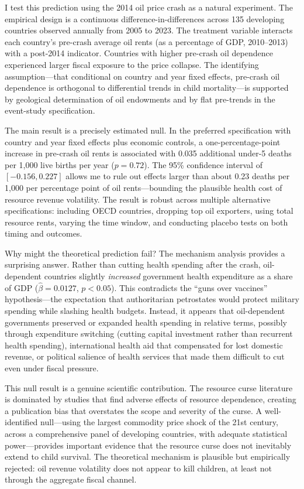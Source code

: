 \documentclass[12pt]{article}
\begin{document}
I test this prediction using the 2014 oil price crash as a natural experiment. The empirical design is a continuous difference-in-differences across 135 developing countries observed annually from 2005 to 2023. The treatment variable interacts each country's pre-crash average oil rents (as a percentage of GDP, 2010--2013) with a post-2014 indicator. Countries with higher pre-crash oil dependence experienced larger fiscal exposure to the price collapse. The identifying assumption---that conditional on country and year fixed effects, pre-crash oil dependence is orthogonal to differential trends in child mortality---is supported by geological determination of oil endowments and by flat pre-trends in the event-study specification.

The main result is a precisely estimated null. In the preferred specification with country and year fixed effects plus economic controls, a one-percentage-point increase in pre-crash oil rents is associated with 0.035 additional under-5 deaths per 1,000 live births per year ($p = 0.72$). The 95\% confidence interval of $[-0.156, 0.227]$ allows me to rule out effects larger than about 0.23 deaths per 1,000 per percentage point of oil rents---bounding the plausible health cost of resource revenue volatility. The result is robust across multiple alternative specifications: including OECD countries, dropping top oil exporters, using total resource rents, varying the time window, and conducting placebo tests on both timing and outcomes.

Why might the theoretical prediction fail? The mechanism analysis provides a surprising answer. Rather than cutting health spending after the crash, oil-dependent countries slightly \textit{increased} government health expenditure as a share of GDP ($\hat{\beta} = 0.0127$, $p < 0.05$). This contradicts the ``guns over vaccines'' hypothesis---the expectation that authoritarian petrostates would protect military spending while slashing health budgets. Instead, it appears that oil-dependent governments preserved or expanded health spending in relative terms, possibly through expenditure switching (cutting capital investment rather than recurrent health spending), international health aid that compensated for lost domestic revenue, or political salience of health services that made them difficult to cut even under fiscal pressure.

This null result is a genuine scientific contribution. The resource curse literature is dominated by studies that find adverse effects of resource dependence, creating a publication bias that overstates the scope and severity of the curse. A well-identified null---using the largest commodity price shock of the 21st century, across a comprehensive panel of developing countries, with adequate statistical power---provides important evidence that the resource curse does not inevitably extend to child survival. The theoretical mechanism is plausible but empirically rejected: oil revenue volatility does not appear to kill children, at least not through the aggregate fiscal channel.
\end{document}

